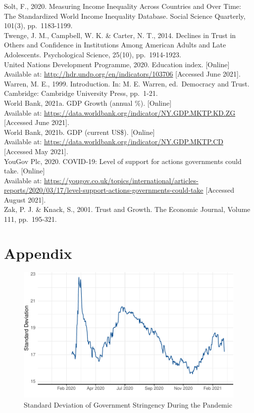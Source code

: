 \documentclass[
  12pt,
]{article}
\begin{document}
Solt, F., 2020. Measuring Income Inequality Across Countries and Over Time: The Standardized World Income Inequality Database. Social Science Quarterly, 101(3), pp.~1183-1199.\\
Twenge, J. M., Campbell, W. K. \& Carter, N. T., 2014. Declines in Trust in Others and Confidence in Institutions Among American Adults and Late Adolescents. Psychological Science, 25(10), pp.~1914-1923.\\
United Nations Development Programme, 2020. Education index. {[}Online{]}\\
Available at: \url{http://hdr.undp.org/en/indicators/103706} {[}Accessed June 2021{]}.\\
Warren, M. E., 1999. Introduction. In: M. E. Warren, ed.~Democracy and Trust. Cambridge: Cambridge University Press, pp.~1-21.\\
World Bank, 2021a. GDP Growth (annual \%). {[}Online{]}\\
Available at: \url{https://data.worldbank.org/indicator/NY.GDP.MKTP.KD.ZG} {[}Accessed June 2021{]}.\\
World Bank, 2021b. GDP (current US\$). {[}Online{]}\\
Available at: \url{https://data.worldbank.org/indicator/NY.GDP.MKTP.CD} {[}Accessed May 2021{]}.\\
YouGov Plc, 2020. COVID-19: Level of support for actions governments could take. {[}Online{]}\\
Available at: \url{https://yougov.co.uk/topics/international/articles-reports/2020/03/17/level-support-actions-governments-could-take} {[}Accessed August 2021{]}.\\
Zak, P. J. \& Knack, S., 2001. Trust and Growth. The Economic Journal, Volume 111, pp.~195-321.\\

\newpage

\hypertarget{appendix}{%
\section*{Appendix}\label{appendix}}

\setcounter{table}{0}  \renewcommand{\thetable}{A\arabic{table}} \setcounter{figure}{0} \renewcommand{\thefigure}{A\arabic{figure}}

\begin{figure}
\includegraphics[width=0.8\linewidth]{write_up_test_files/figure-latex/stringency-sd-1} \caption{Standard Deviation of Government Stringency During the Pandemic}\label{fig:stringency-sd}
\end{figure}
\end{document}
